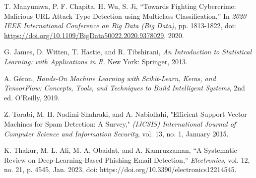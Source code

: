 \documentclass[conference]{IEEEtran}
\begin{document}
\begin{thebibliography}{00}
    T. Manyumwa, P. F. Chapita, H. Wu, S. Ji,
    ``Towards Fighting Cybercrime: Malicious URL Attack Type Detection using Multiclass Classification,''
    In \emph{2020 IEEE International Conference on Big Data (Big Data)},
    pp. 1813-1822,
    doi: \url{https://doi.org/10.1109/BigData50022.2020.9378029},
    2020.

    G. James, D. Witten, T. Hastie, and R. Tibshirani, \emph{An Introduction to Statistical Learning: with Applications in R}. New York: Springer, 2013.

    A. Géron, \emph{Hands-On Machine Learning with Scikit-Learn, Keras, and TensorFlow: Concepts, Tools, and Techniques to Build Intelligent Systems}, 2nd ed. O'Reilly, 2019.
    
    Z. Torabi, M. H. Nadimi-Shahraki, and A. Nabiollahi, "Efficient Support Vector Machines for Spam Detection: A Survey," \emph{(IJCSIS) International Journal of Computer Science and Information Security}, vol. 13, no. 1, January 2015.

    K. Thakur, M. L. Ali, M. A. Obaidat, and A. Kamruzzaman, “A Systematic Review on Deep-Learning-Based Phishing Email Detection,” \emph{Electronics}, vol. 12, no. 21, p. 4545, Jan. 2023, doi: https://doi.org/10.3390/electronics12214545.

\end{thebibliography}
\vspace{12pt}
\end{document}
